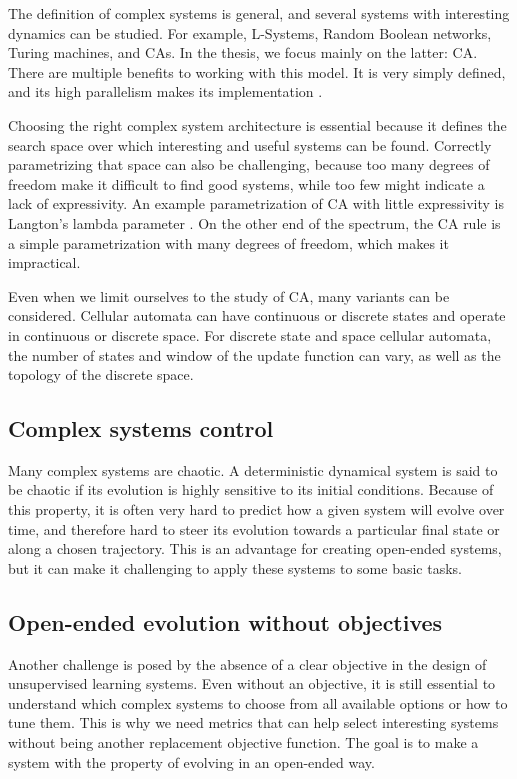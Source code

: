 The definition of complex systems is general, and several systems with
interesting dynamics can be studied. For example, L-Systems, Random Boolean
networks, Turing machines, and \Acfp{CA}. In the thesis, we focus mainly on
the latter: \ac{CA}. There are multiple benefits to working with this model. It
is very simply defined, and its high parallelism makes its implementation .

Choosing the right complex system architecture is essential because it defines
the search space over which interesting and useful systems can be found.
Correctly parametrizing that space can also be challenging, because too many
degrees of freedom make it difficult to find good systems, while too few might
indicate a lack of expressivity. An example parametrization of \ac{CA} with
little expressivity is Langton's lambda parameter
\parencite{langton_computation_1990}. On the other end of the spectrum, the
\ac{CA} rule is a simple parametrization with many degrees of freedom, which makes it
impractical.

Even when we limit ourselves to the study of \ac{CA}, many variants
can be considered. Cellular automata can have continuous or discrete states and operate in continuous or discrete space. For discrete state and space cellular
automata, the number of states and window of the update function can vary, as
well as the topology of the discrete space.


\subsection{Complex systems control}\label{sec:compl-syst-contr}

Many complex systems are chaotic. A deterministic dynamical system is said to be
chaotic if its evolution is highly sensitive to its initial conditions. Because
of this property, it is often very hard to predict how a given system will
evolve over time, and therefore hard to steer its evolution towards a particular
final state or along a chosen trajectory. This is an advantage for creating
open-ended systems, but it can make it challenging to apply these systems to some
basic tasks.

\subsection{Open-ended evolution without
  objectives}\label{sec:open-ended-evolution}

Another challenge is posed by the absence of a clear objective in the design of
unsupervised learning systems. Even without an objective, it is still essential
to understand which complex systems to choose from all available options or how
to tune them. This is why we need metrics that can help select interesting
systems without being another replacement objective function. The goal is to
make a system with the property of evolving in an open-ended way.

